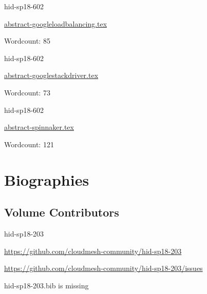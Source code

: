 

\begin{IU}

hid-sp18-602

\href{https://github.com/cloudmesh-community/hid-sp18-602/blob/master//technology/abstract-googleloadbalancing.tex}{abstract-googleloadbalancing.tex}

 

Wordcount: 85

\end{IU}



\begin{IU}

hid-sp18-602

\href{https://github.com/cloudmesh-community/hid-sp18-602/blob/master//technology/abstract-googlestackdriver.tex}{abstract-googlestackdriver.tex}

 

Wordcount: 73

\end{IU}



\begin{IU}

hid-sp18-602

\href{https://github.com/cloudmesh-community/hid-sp18-602/blob/master//technology/abstract-spinnaker.tex}{abstract-spinnaker.tex}

 

Wordcount: 121

\end{IU}

\part{Biographies}
\chapter{Volume Contributors}


\begin{IU}

hid-sp18-203

\url{https://github.com/cloudmesh-community/hid-sp18-203}

\url{https://github.com/cloudmesh-community/hid-sp18-203/issues}

hid-sp18-203.bib is missing

\end{IU}


